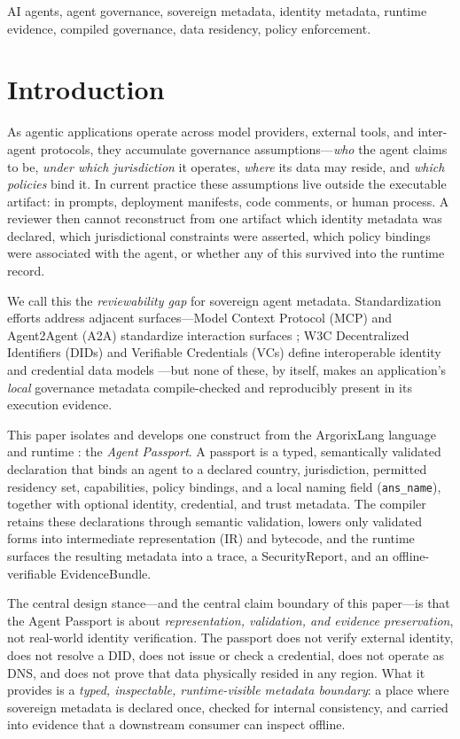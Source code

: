 \documentclass[conference]{IEEEtran}
\newcommand{\code}[1]{\texttt{\small #1}}
\newcommand{\Argorix}{%
\textcolor{argViolet}{A}\textcolor{argViolet}{r}\textcolor{argIndigo}{g}\textcolor{argIndigo}{o}\textcolor{argElectric}{r}\textcolor{argElectric}{i}\textcolor{argElectric}{x}\textcolor{argCyan}{L}\textcolor{argCyan}{a}\textcolor{argCyanBright}{n}\textcolor{argCyanBright}{g}\xspace}
\begin{document}
\begin{IEEEkeywords}
AI agents, agent governance, sovereign metadata, identity metadata, runtime
evidence, compiled governance, data residency, policy enforcement.
\end{IEEEkeywords}

\section{Introduction}\label{sec:intro}
As agentic applications operate across model providers, external tools, and
inter-agent protocols, they accumulate governance assumptions---\emph{who} the
agent claims to be, \emph{under which jurisdiction} it operates, \emph{where} its
data may reside, and \emph{which policies} bind it. In current practice these
assumptions live outside the executable artifact: in prompts, deployment
manifests, code comments, or human process. A reviewer then cannot reconstruct
from one artifact which identity metadata was declared, which jurisdictional
constraints were asserted, which policy bindings were associated with the agent,
or whether any of this survived into the runtime record.

We call this the \emph{reviewability gap} for sovereign agent metadata.
Standardization efforts address adjacent surfaces---Model Context Protocol (MCP)
and Agent2Agent (A2A) standardize interaction surfaces
\cite{mcp_spec_2025,a2a_spec}; W3C Decentralized Identifiers (DIDs) and
Verifiable Credentials (VCs) define interoperable identity and credential data
models \cite{w3c_did_core_2022,w3c_vc_data_model_2025}---but none of these, by
itself, makes an application's \emph{local} governance metadata compile-checked
and reproducibly present in its execution evidence.

This paper isolates and develops one construct from the \Argorix language and
runtime \cite{venegas2026argorixlang,argorixlang2026}: the \emph{Agent Passport}. A passport is a
typed, semantically validated declaration that binds an agent to a declared
country, jurisdiction, permitted residency set, capabilities, policy bindings,
and a local naming field (\code{ans\_name}), together with optional identity,
credential, and trust metadata. The compiler retains these declarations through
semantic validation, lowers only validated forms into intermediate
representation (IR) and bytecode, and the runtime surfaces the resulting
metadata into a trace, a SecurityReport, and an offline-verifiable
EvidenceBundle.

The central design stance---and the central claim boundary of this paper---is
that the Agent Passport is about \emph{representation, validation, and evidence
preservation}, not real-world identity verification. The passport does not
verify external identity, does not resolve a DID, does not issue or check a
credential, does not operate as DNS, and does not prove that data physically
resided in any region. What it provides is a \emph{typed, inspectable,
runtime-visible metadata boundary}: a place where sovereign metadata is declared
once, checked for internal consistency, and carried into evidence that a
downstream consumer can inspect offline.
\end{document}
